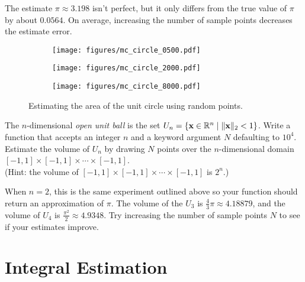The estimate $\pi \approx 3.198$ isn't perfect, but it only differs from the true value of $\pi$ by about $0.0564$.
On average, increasing the number of sample points decreases the estimate error.

\begin{figure}[H] %
\captionsetup[subfigure]{justification=centering}
\centering
\begin{subfigure}{.32\textwidth}
    \centering
    \texttt{[image: figures/mc\_circle\_0500.pdf]}
\end{subfigure}
%
\begin{subfigure}{.32\textwidth}
    \centering
    \texttt{[image: figures/mc\_circle\_2000.pdf]}
\end{subfigure}
%
\begin{subfigure}{.32\textwidth}
    \centering
    \texttt{[image: figures/mc\_circle\_8000.pdf]}
\end{subfigure}
\caption{Estimating the area of the unit circle using random points.}
\end{figure}

\begin{problem}
The $n$-dimensional \emph{open unit ball} is the set $U_n = \{\mathbf{x}\in\mathbb{R}^n\mid \|\mathbf{x}\|_2 < 1\}$.
Write a function that accepts an integer $n$ and a keyword argument $N$ defaulting to $10^4$.
Estimate the volume of $U_n$ by drawing $N$ points over the $n$-dimensional domain $[-1,1]\times[-1,1]\times\cdots\times[-1,1]$.
\\(Hint: the volume of $[-1,1]\times[-1,1]\times\cdots\times[-1,1]$ is $2^n$.)

When $n=2$, this is the same experiment outlined above so your function should return an approximation of $\pi$.
The volume of the $U_3$ is $\frac{4}{3}\pi \approx 4.18879$, and the volume of $U_4$ is $\frac{\pi^2}{2} \approx 4.9348$.
Try increasing the number of sample points $N$ to see if your estimates improve.
\label{prob:unit-ball-volume}
\end{problem}

\section*{Integral Estimation} %

